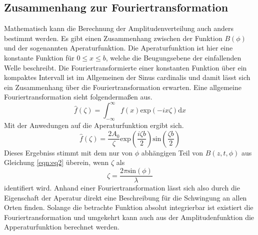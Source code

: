 \subsection{Zusammenhang zur Fouriertransformation}
Mathematisch kann die Berechnung der Amplitudenverteilung auch anders bestimmt werden. Es gibt einen Zusammenhang zwischen der Funktion $B(\phi)$ und der sogenannten Aperaturfunktion. Die Aperaturfunktion ist hier eine konstante Funktion 
für $ 0 \leq x \leq b$, welche die Beugungsebene der einfallenden Welle beschreibt.
Die Fouriertransformierte einer konstanten Funktion über ein kompaktes Intervall ist im Allgemeinen der Sinus cardinalis und damit lässt sich ein Zusammenhang über die Fouriertransformation erwarten.
Eine allgemeine Fouriertransformation sieht folgendermaßen aus.
\begin{equation}
\hat{f}(\zeta) = \int_{-\infty}^{\infty} f(x) \text{exp}(-ix\zeta) \text{d}x
\end{equation}
Mit der Anwedungen auf die Aperaturfunktion ergibt sich.
\begin{equation}
    \hat{f}(\zeta) = \frac{2A_{0}}{\zeta} \text{exp}\left(\frac{i \zeta b}{2}\right) \text{sin}\left(\frac{\zeta b}{2}\right)
\end{equation}
Dieses Ergebniss stimmt mit dem nur von $\phi$ abhängigen Teil von $B(z, t, \phi)$ aus Gleichung \eqref{eqn:eq2} überein, wenn $\zeta$ als
\begin{equation}
\zeta = \frac{2\pi \text{sin}(\phi)}{\lambda}
\end{equation}
identifiert wird. Anhand einer Fouriertransformation lässt sich also durch die Eigenschaft der Aperatur direkt eine Beschreibung für die Schwingung an allen Orten finden. Solange die betrachte Funktion absolut integrierbar ist existiert die Fouriertransformation und umgekehrt
kann auch aus der Amplitudenfunktion die Apperaturfunktion berechnet werden. 
